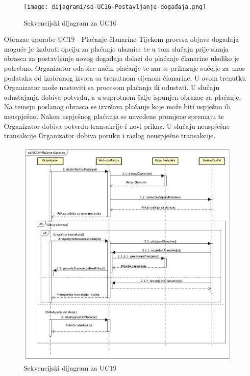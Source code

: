 				\begin{figure}[H]
					\texttt{[image: dijagrami/sd-UC16-Postavljanje-događaja.png]} %
					\centering
					\caption{Sekvencijski dijagram za UC16}
					\label{fig:promjene}
				\end{figure}
				\eject		
				
				\LARGE {Obrazac uporabe UC19 - Plaćanje članarine}
				\newline
				\normalsize
				Tijekom procesa objave događaja moguće je izabrati opciju za plaćanje ulaznice te u tom slučaju prije slanja obrasca za postavljanje novog događaja dolazi do plaćanje članarine ukoliko je potrebno. 
				Organizator odabire način plaćanje te mu se prikazuje sučelje za unos podataka od izabranog izvora sa trenutnom cijenom članarine. U ovom trenutku Organizator može nastaviti sa procesom plaćanja ili odustati. U slučaju odustajanja dobiva potvrdu, a u suprotnom šalje ispunjen obrazac za plaćanje. Na temeju poslanog obrasca se izvršava plaćanje koje može biti uspješno ili neuspješno. Nakon uspješnog plaćanja se navedene promjene spremaju te Organizator dobiva potvrdu transakcije i novi prikaz. U slučaju neuspješne transakcije Organizator dobiva poruku i razlog neuspješne transakcije.
				
				\begin{figure}[H]
					\includegraphics[scale=0.5]{dijagrami/sd-UC19-Placanje-clanarine.png} %
					\centering
					\caption{Sekvencijski dijagram za UC19}
					\label{fig:promjene}
				\end{figure}
				\eject		
				
